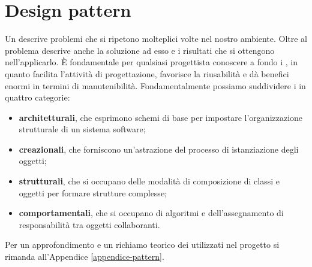\section{Design pattern}

Un  descrive problemi che si ripetono molteplici volte nel nostro ambiente. Oltre al problema descrive anche la soluzione ad esso e i risultati che si ottengono nell'applicarlo. È fondamentale per qualsiasi progettista conoscere a fondo i , in quanto facilita l'attività di progettazione, favorisce la riusabilità e dà benefici enormi in termini di manutenibilità. Fondamentalmente possiamo suddividere i  in quattro categorie:

\begin{itemize}

	\item \textbf{ architetturali}, che esprimono schemi di base per impostare l'organizzazione strutturale di un sistema software;
	\item \textbf{ creazionali}, che forniscono un'astrazione del processo di istanziazione degli oggetti;
	\item \textbf{ strutturali}, che si occupano delle modalità di composizione di classi e oggetti per formare strutture complesse; 
	\item \textbf{ comportamentali}, che si occupano di algoritmi e dell'assegnamento di responsabilità tra oggetti collaboranti.

\end{itemize}

Per un approfondimento e un richiamo teorico dei  utilizzati nel progetto  si rimanda all'Appendice \ref{appendice-pattern}.

%
%
%
%
%
%
%
%
%
%
%
